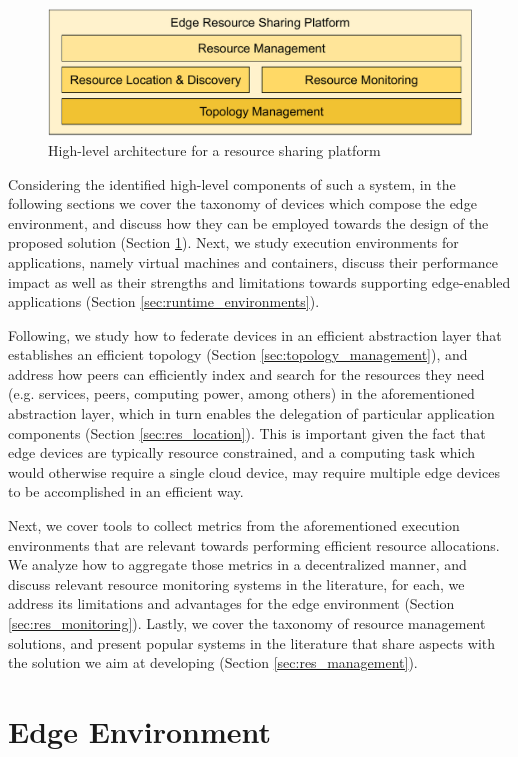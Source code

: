 \begin{figure}
    \centering
    \includegraphics[width=0.55\linewidth]{Chapters/Figures/proposed_architecture.pdf}
    \caption{High-level architecture for a resource sharing platform}
    \label{fig:proposed_architecture}
\end{figure}

Considering the identified high-level components of such a system, in the following sections we cover the taxonomy of devices which compose the edge environment, and discuss how they can be employed towards the design of the proposed solution (Section \ref{sec:edge_computing}). Next, we study execution environments for applications, namely virtual machines and containers, discuss their performance impact as well as their strengths and limitations towards supporting edge-enabled applications (Section \ref{sec:runtime_environments}).

Following, we study how to federate devices in an efficient abstraction layer  that establishes an efficient topology (Section \ref{sec:topology_management}), and address how peers can efficiently index and search for the resources they need (e.g. services, peers, computing power, among others) in the aforementioned abstraction layer, which in turn enables the delegation of particular application components (Section \ref{sec:res_location}). This is important given the fact that edge devices are typically resource constrained, and a computing task which would otherwise require a single cloud device, may require multiple edge devices to be accomplished in an efficient way.

Next, we cover tools to collect metrics from the aforementioned execution environments that are relevant towards performing efficient resource allocations. We analyze how to aggregate those metrics in a decentralized manner, and discuss relevant resource monitoring systems in the literature, for each, we address its limitations and advantages for the edge environment (Section \ref{sec:res_monitoring}). Lastly, we cover the taxonomy of resource management solutions, and present popular systems in the literature that share aspects with the solution we aim at developing (Section \ref{sec:res_management}).

\section{Edge Environment} \label{sec:edge_computing} 

